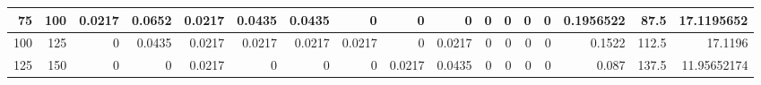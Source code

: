 \begin{table}[ht]
\begin{adjustbox}{width = \textwidth, center}
\begin{tabular}{|rr|r|r|r|r|r|r|r|r|r|r|r|r|r|r|r|}
            \cellcolor[HTML]{D9EAD3}75             & \cellcolor[HTML]{C8E4BE}100            & \cellcolor[HTML]{C7E9D8}0.0217                 & \cellcolor[HTML]{57BB8A}0.0652                 & \cellcolor[HTML]{C7E9D8}0.0217                 & \cellcolor[HTML]{8FD2B1}0.0435                 & \cellcolor[HTML]{8FD2B1}0.0435                 & \cellcolor[HTML]{FFFFFF}0                      & \cellcolor[HTML]{FFFFFF}0                      & \cellcolor[HTML]{FFFFFF}0                       & \cellcolor[HTML]{FFFFFF}0                       & \cellcolor[HTML]{FFFFFF}0                       & \cellcolor[HTML]{FFFFFF}0                       & \cellcolor[HTML]{FFFFFF}0                       & \cellcolor[HTML]{D9D2E9}0.1956522                                               & \cellcolor[HTML]{D9D2E9}87.5                                            & \cellcolor[HTML]{D9D2E9}17.1195652                                                    \\ \hline
            \cellcolor[HTML]{D9EAD3}100            & \cellcolor[HTML]{C8E4BE}125            & \cellcolor[HTML]{FFFFFF}0                      & \cellcolor[HTML]{8FD2B1}0.0435                 & \cellcolor[HTML]{C7E9D8}0.0217                 & \cellcolor[HTML]{C7E9D8}0.0217                 & \cellcolor[HTML]{C7E9D8}0.0217                 & \cellcolor[HTML]{C7E9D8}0.0217                 & \cellcolor[HTML]{FFFFFF}0                      & \cellcolor[HTML]{C7E9D8}0.0217                  & \cellcolor[HTML]{FFFFFF}0                       & \cellcolor[HTML]{FFFFFF}0                       & \cellcolor[HTML]{FFFFFF}0                       & \cellcolor[HTML]{FFFFFF}0                       & \cellcolor[HTML]{D9D2E9}0.1522                                                  & \cellcolor[HTML]{D9D2E9}112.5                                           & \cellcolor[HTML]{D9D2E9}17.1196                                                       \\ \hline
            \rowcolor[HTML]{FFFFFF} 
            \cellcolor[HTML]{D9EAD3}125            & \cellcolor[HTML]{C8E4BE}150            & 0                                              & 0                                              & \cellcolor[HTML]{C7E9D8}0.0217                 & 0                                              & 0                                              & 0                                              & \cellcolor[HTML]{C7E9D8}0.0217                 & \cellcolor[HTML]{8FD2B1}0.0435                  & 0                                               & 0                                               & 0                                               & 0                                               & \cellcolor[HTML]{D9D2E9}0.087                                                   & \cellcolor[HTML]{D9D2E9}137.5                                           & \cellcolor[HTML]{D9D2E9}11.95652174                                                   \\ \hline

\end{tabular}
\end{adjustbox}
\end{table}
